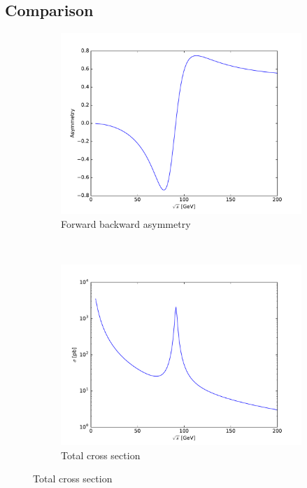 \documentclass{article}
\begin{document}
\subsection{Comparison}
\begin{figure}[h!]
  \caption{$e^+e^-\rightarrow \tau^+\tau^-$}
  \centering
  \begin{subfigure}[b]{0.45\textwidth}
    \includegraphics[width=\textwidth]{../tables/ZAsym.pdf}
    \caption{Forward backward asymmetry}
  \end{subfigure}
  ~
  \begin{subfigure}[b]{0.45\textwidth}
    \includegraphics[width=\textwidth]{../tables/ZCross.pdf}
    \caption{Total cross section}
  \end{subfigure}
\end{figure}
\newpage
\end{document}
